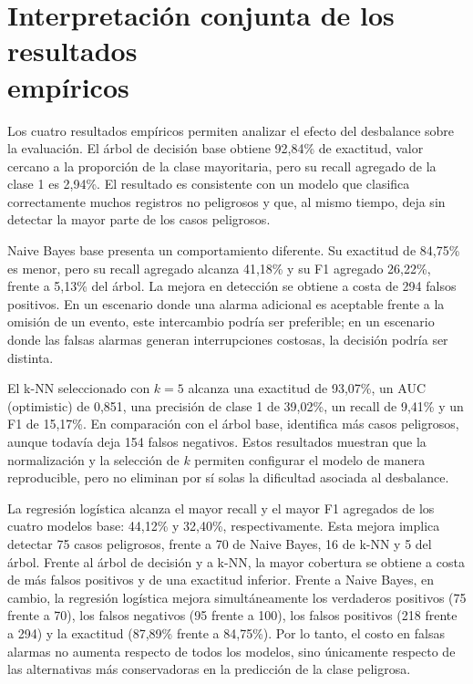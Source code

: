 \documentclass[12pt,a4paper]{article}
\begin{document}
\section[Interpretación conjunta de los resultados empíricos]{Interpretación conjunta de los resultados\\empíricos}
Los cuatro resultados empíricos permiten analizar el efecto del desbalance sobre la evaluación. El árbol de decisión base obtiene 92,84\% de exactitud, valor cercano a la proporción de la clase mayoritaria, pero su recall agregado de la clase 1 es 2,94\%. El resultado es consistente con un modelo que clasifica correctamente muchos registros no peligrosos y que, al mismo tiempo, deja sin detectar la mayor parte de los casos peligrosos.

Naive Bayes base presenta un comportamiento diferente. Su exactitud de 84,75\% es menor, pero su recall agregado alcanza 41,18\% y su F1 agregado 26,22\%, frente a 5,13\% del árbol. La mejora en detección se obtiene a costa de 294 falsos positivos. En un escenario donde una alarma adicional es aceptable frente a la omisión de un evento, este intercambio podría ser preferible; en un escenario donde las falsas alarmas generan interrupciones costosas, la decisión podría ser distinta.

El k-NN seleccionado con $k=5$ alcanza una exactitud de 93,07\%, un AUC (optimistic) de 0,851, una precisión de clase 1 de 39,02\%, un recall de 9,41\% y un F1 de 15,17\%. En comparación con el árbol base, identifica más casos peligrosos, aunque todavía deja 154 falsos negativos. Estos resultados muestran que la normalización y la selección de $k$ permiten configurar el modelo de manera reproducible, pero no eliminan por sí solas la dificultad asociada al desbalance.

La regresión logística alcanza el mayor recall y el mayor F1 agregados de los cuatro modelos base: 44,12\% y 32,40\%, respectivamente. Esta mejora implica detectar 75 casos peligrosos, frente a 70 de Naive Bayes, 16 de k-NN y 5 del árbol. Frente al árbol de decisión y a k-NN, la mayor cobertura se obtiene a costa de más falsos positivos y de una exactitud inferior. Frente a Naive Bayes, en cambio, la regresión logística mejora simultáneamente los verdaderos positivos (75 frente a 70), los falsos negativos (95 frente a 100), los falsos positivos (218 frente a 294) y la exactitud (87,89\% frente a 84,75\%). Por lo tanto, el costo en falsas alarmas no aumenta respecto de todos los modelos, sino únicamente respecto de las alternativas más conservadoras en la predicción de la clase peligrosa.
\end{document}
